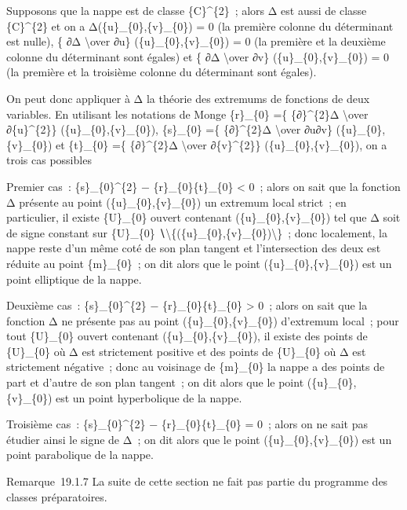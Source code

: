 \documentclass[]{article}
\begin{document}
Supposons que la nappe est de classe \{C\}\^{}\{2\}~; alors Δ est aussi
de classe \{C\}\^{}\{2\} et on a Δ(\{u\}\_\{0\},\{v\}\_\{0\}) = 0 (la
première colonne du déterminant est nulle), \{ ∂Δ \textbackslash{}over
∂u\} (\{u\}\_\{0\},\{v\}\_\{0\}) = 0 (la première et la deuxième colonne
du déterminant sont égales) et \{ ∂Δ \textbackslash{}over ∂v\}
(\{u\}\_\{0\},\{v\}\_\{0\}) = 0 (la première et la troisième colonne du
déterminant sont égales).

On peut donc appliquer à Δ la théorie des extremums de fonctions de deux
variables. En utilisant les notations de Monge \{r\}\_\{0\} =\{
\{∂\}\^{}\{2\}Δ \textbackslash{}over ∂\{u\}\^{}\{2\}\}
(\{u\}\_\{0\},\{v\}\_\{0\}), \{s\}\_\{0\} =\{ \{∂\}\^{}\{2\}Δ
\textbackslash{}over ∂u∂v\} (\{u\}\_\{0\},\{v\}\_\{0\}) et \{t\}\_\{0\}
=\{ \{∂\}\^{}\{2\}Δ \textbackslash{}over ∂\{v\}\^{}\{2\}\}
(\{u\}\_\{0\},\{v\}\_\{0\}), on a trois cas possibles

Premier cas~: \{s\}\_\{0\}\^{}\{2\} − \{r\}\_\{0\}\{t\}\_\{0\}
\textless{} 0~; alors on sait que la fonction Δ présente au point
(\{u\}\_\{0\},\{v\}\_\{0\}) un extremum local strict~; en particulier,
il existe \{U\}\_\{0\} ouvert contenant (\{u\}\_\{0\},\{v\}\_\{0\}) tel
que Δ soit de signe constant sur \{U\}\_\{0\}
∖\textbackslash{}\{(\{u\}\_\{0\},\{v\}\_\{0\})\textbackslash{}\}~; donc
localement, la nappe reste d'un même coté de son plan tangent et
l'intersection des deux est réduite au point \{m\}\_\{0\}~; on dit alors
que le point (\{u\}\_\{0\},\{v\}\_\{0\}) est un point elliptique de la
nappe.

Deuxième cas~: \{s\}\_\{0\}\^{}\{2\} − \{r\}\_\{0\}\{t\}\_\{0\}
\textgreater{} 0~; alors on sait que la fonction Δ ne présente pas au
point (\{u\}\_\{0\},\{v\}\_\{0\}) d'extremum local~; pour tout
\{U\}\_\{0\} ouvert contenant (\{u\}\_\{0\},\{v\}\_\{0\}), il existe des
points de \{U\}\_\{0\} où Δ est strictement positive et des points de
\{U\}\_\{0\} où Δ est strictement négative~; donc au voisinage de
\{m\}\_\{0\} la nappe a des points de part et d'autre de son plan
tangent~; on dit alors que le point (\{u\}\_\{0\},\{v\}\_\{0\}) est un
point hyperbolique de la nappe.

Troisième cas~: \{s\}\_\{0\}\^{}\{2\} − \{r\}\_\{0\}\{t\}\_\{0\} = 0~;
alors on ne sait pas étudier ainsi le signe de Δ~; on dit alors que le
point (\{u\}\_\{0\},\{v\}\_\{0\}) est un point parabolique de la nappe.

Remarque~19.1.7 La suite de cette section ne fait pas partie du
programme des classes préparatoires.
\end{document}
